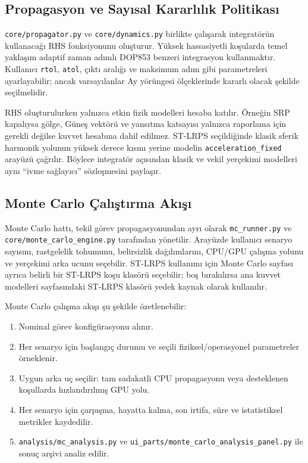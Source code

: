 \subsection{Propagasyon ve Sayısal Kararlılık Politikası}

\texttt{core/propagator.py} ve \texttt{core/dynamics.py} birlikte çalışarak integratörün kullanacağı RHS fonksiyonunu oluşturur. Yüksek hassasiyetli koşularda temel yaklaşım adaptif zaman adımlı DOP853 benzeri integrasyon kullanmaktır. Kullanıcı \texttt{rtol}, \texttt{atol}, çıktı aralığı ve maksimum adım gibi parametreleri ayarlayabilir; ancak varsayılanlar Ay yörüngesi ölçeklerinde kararlı olacak şekilde seçilmelidir.

RHS oluşturulurken yalnızca etkin fizik modelleri hesaba katılır. Örneğin SRP kapalıysa gölge, Güneş vektörü ve yansıtma katsayısı yalnızca raporlama için gerekli değilse kuvvet hesabına dahil edilmez. ST-LRPS seçildiğinde klasik sferik harmonik yolunun yüksek derece kısmı yerine modelin \texttt{acceleration\_fixed} arayüzü çağrılır. Böylece integratör açısından klasik ve vekil yerçekimi modelleri aynı ``ivme sağlayıcı'' sözleşmesini paylaşır.

\subsection{Monte Carlo Çalıştırma Akışı}

Monte Carlo hattı, tekil görev propagasyonundan ayrı olarak \texttt{mc\_runner.py} ve \texttt{core/monte\_carlo\_engine.py} tarafından yönetilir. Arayüzde kullanıcı senaryo sayısını, rastgelelik tohumunu, belirsizlik dağılımlarını, CPU/GPU çalışma yolunu ve yerçekimi arka ucunu seçebilir. ST-LRPS kullanımı için Monte Carlo sayfası ayrıca belirli bir ST-LRPS koşu klasörü seçebilir; boş bırakılırsa ana kuvvet modelleri sayfasındaki ST-LRPS klasörü yedek kaynak olarak kullanılır.

Monte Carlo çalışma akışı şu şekilde özetlenebilir:
\begin{enumerate}
    \item Nominal görev konfigürasyonu alınır.
    \item Her senaryo için başlangıç durumu ve seçili fiziksel/operasyonel parametreler örneklenir.
    \item Uygun arka uç seçilir: tam sadakatli CPU propagasyonu veya desteklenen koşullarda hızlandırılmış GPU yolu.
    \item Her senaryo için çarpışma, hayatta kalma, son irtifa, süre ve istatistiksel metrikler kaydedilir.
    \item \texttt{analysis/mc\_analysis.py} ve \texttt{ui\_parts/monte\_carlo\_analysis\_panel.py} ile sonuç arşivi analiz edilir.
\end{enumerate}

